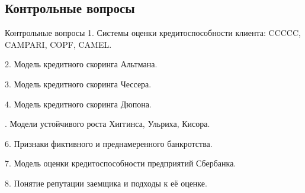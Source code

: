 \documentclass[_Banking_p2.tex]{subfiles}
\begin{document}
\subsection{Контрольные вопросы}
\begin{frame}[allowframebreaks]{Контрольные вопросы}
1. Системы оценки кредитоспособности клиента: CCCCC, CAMPARI, COPF, CAMEL.

2. Модель кредитного скоринга Альтмана.

3. Модель кредитного скоринга Чессера.

4. Модель кредитного скоринга Дюпона.

. Модели устойчивого роста Хиггинса, Ульриха, Кисора.

6. Признаки фиктивного и преднамеренного банкротства.

7. Модель оценки кредитоспособности предприятий Сбербанка.

8. Понятие репутации заемщика и подходы к её оценке.
\end{frame}

\end{document}
